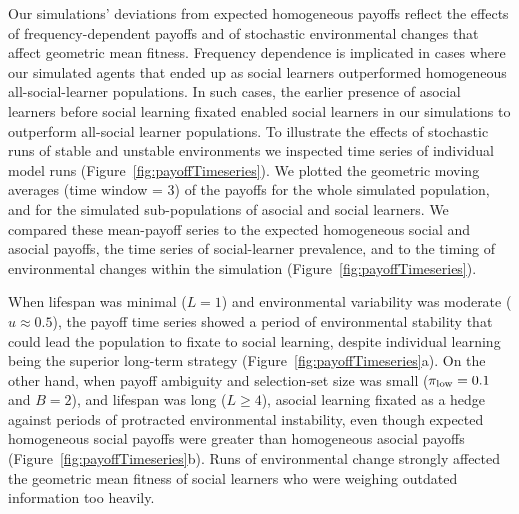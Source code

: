\documentclass[letterpaper,11.5pt]{scrartcl}
\newcommand{\cm}[1]{{\textcolor{mypurple} {({\tiny CM:} #1)}}}
\begin{document}
Our simulations' deviations from expected homogeneous payoffs reflect the effects of frequency-dependent payoffs and of stochastic environmental changes that affect geometric mean fitness. Frequency dependence is implicated in cases where our simulated agents that ended up as social learners outperformed homogeneous all-social-learner populations. In such cases, the earlier presence of asocial learners before social learning fixated enabled social learners in our simulations to outperform all-social learner populations. To illustrate the effects of stochastic runs of stable and unstable environments we inspected time series of individual model runs (Figure~\ref{fig:payoffTimeseries}). We plotted the geometric moving averages (time window = 3) of the payoffs for the whole simulated population, and for the simulated sub-populations of asocial and social learners. We compared these mean-payoff series to the expected homogeneous social and asocial payoffs, the time series of social-learner prevalence, and to the timing of environmental changes within the simulation (Figure~\ref{fig:payoffTimeseries}). 

When lifespan was minimal ($L=1$) and environmental variability was moderate ($u\approx0.5$), the payoff time series showed a period
of environmental stability that
could lead the population to fixate to social learning, despite individual learning being the superior long-term strategy (Figure~\ref{fig:payoffTimeseries}a).
On the other hand, when payoff ambiguity and selection-set size was small ($\pi_{\mathrm{low}}=0.1$ and $B=2$), and lifespan was long ($L \geq 4$), asocial learning fixated as a hedge against periods of protracted environmental instability, even though expected
homogeneous social payoffs were greater than homogeneous asocial payoffs (Figure~\ref{fig:payoffTimeseries}b). Runs of environmental change strongly affected the geometric mean fitness of social learners who were weighing
outdated information too heavily. %
\end{document}
